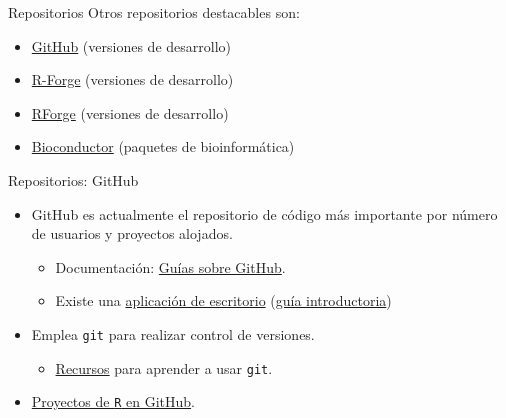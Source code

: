 \documentclass[xcolor={usenames,svgnames,dvipsnames}]{beamer}
\begin{document}
\begin{frame}[label={sec:orgc367e01}]{Repositorios}
Otros repositorios destacables son:

\begin{itemize}
\item \href{https://github.com/}{GitHub} (versiones de desarrollo)

\item \href{http://r-forge.r-project.org/}{R-Forge} (versiones de desarrollo)

\item \href{http://rforge.net/}{RForge} (versiones de desarrollo)

\item \href{http://www.bioconductor.org/}{Bioconductor} (paquetes de bioinformática)
\end{itemize}
\end{frame}

\begin{frame}[fragile,label={sec:org75b9557}]{Repositorios: GitHub}
 \begin{itemize}
\item GitHub es actualmente el repositorio de código más importante por número de usuarios y proyectos alojados.
\begin{itemize}
\item Documentación: \href{https://guides.github.com/}{Guías sobre GitHub}.
\item Existe una \href{https://desktop.github.com/}{aplicación de escritorio} (\href{https://help.github.com/desktop/guides/getting-started/}{guía introductoria})
\end{itemize}
\item Emplea \texttt{git} para realizar control de versiones.
\begin{itemize}
\item \href{https://help.github.com/articles/good-resources-for-learning-git-and-github/}{Recursos} para aprender a usar \texttt{git}.
\end{itemize}
\item \href{https://github.com/search?o=desc\&q=language:R\&ref=searchresults\&s=stars\&type=Repositories}{Proyectos de \texttt{R} en GitHub}.
\end{itemize}
\end{frame}
\end{document}

